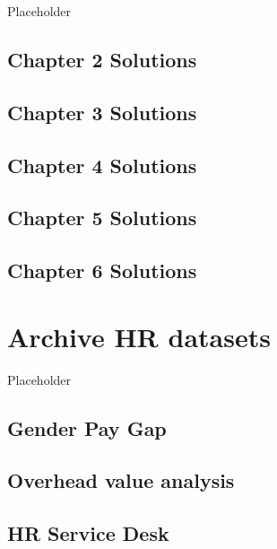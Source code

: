 \documentclass[12pt, krantz2,]{krantz}
\begin{document}
Placeholder

\hypertarget{chapter-2-solutions}{%
\section{Chapter 2 Solutions}\label{chapter-2-solutions}}

\hypertarget{chapter-3-solutions}{%
\section{Chapter 3 Solutions}\label{chapter-3-solutions}}

\hypertarget{chapter-4-solutions}{%
\section{Chapter 4 Solutions}\label{chapter-4-solutions}}

\hypertarget{chapter-5-solutions}{%
\section{Chapter 5 Solutions}\label{chapter-5-solutions}}

\hypertarget{chapter-6-solutions}{%
\section{Chapter 6 Solutions}\label{chapter-6-solutions}}

\hypertarget{appendixE}{%
\chapter{Archive HR datasets}\label{appendixE}}

Placeholder

\hypertarget{gender_pay_gap}{%
\section{Gender Pay Gap}\label{gender_pay_gap}}

\hypertarget{overhead}{%
\section{Overhead value analysis}\label{overhead}}

\hypertarget{service_desk_data}{%
\section{HR Service Desk}\label{service_desk_data}}
\end{document}
